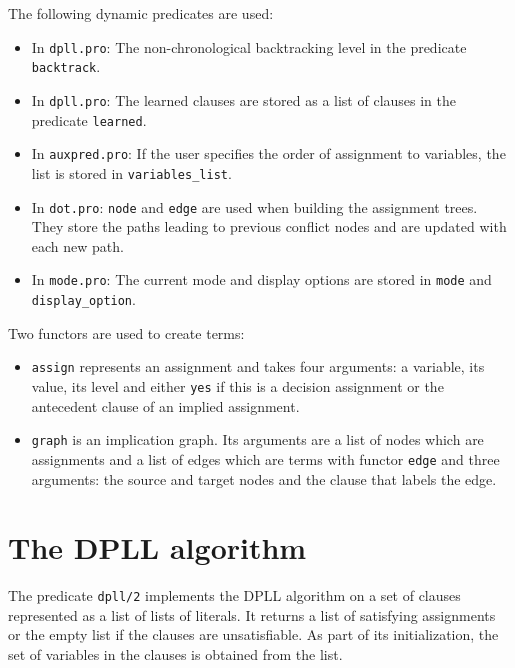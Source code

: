\documentclass[11pt]{article}
\newcommand*{\p}[1]{\textup{\texttt{#1}}}
\begin{document}
The following dynamic predicates are used:
\begin{itemize}
\item In \p{dpll.pro}: The non-chronological backtracking level in the
predicate \p{backtrack}.

\item In \p{dpll.pro}: The learned clauses are stored as a list of
clauses in the predicate \p{learned}.

\item In \p{auxpred.pro}: If the user specifies the order of assignment
to variables, the list is stored in \p{variables\_list}.

\item In \p{dot.pro}: \p{node} and \p{edge} are used when building the
assignment trees. They store the paths leading to previous conflict
nodes and are updated with each new path.

\item In \p{mode.pro}: The current mode and display options are stored
in \p{mode} and \p{display\_option}. 

\end{itemize}

\newpage

Two functors are used to create terms:
\begin{itemize}

\item \p{assign} represents an assignment and takes four arguments: a
variable, its value, its level and either \p{yes} if this is a decision
assignment or the antecedent clause of an implied assignment.

\item \p{graph} is an implication graph. Its arguments are a list of
nodes which are assignments and a list of edges which are terms with
functor \p{edge} and three arguments: the source and target nodes
and the clause that labels the edge.
\end{itemize}


\section{The DPLL algorithm}

The predicate \p{dpll/2} implements the DPLL algorithm on a set of
clauses represented as a list of lists of literals. It returns a list of
satisfying assignments or the empty list if the clauses are
unsatisfiable. As part of its initialization, the set of variables in
the clauses is obtained from the list.
\end{document}
